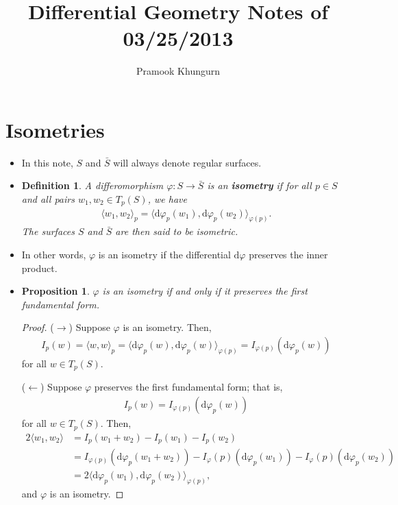 \documentclass[10pt]{article}
\title{Differential Geometry Notes of 03/25/2013}
\author{Pramook Khungurn}
\newtheorem{definition}[lemma]{Definition}
\newtheorem{proposition}[lemma]{Proposition}
\newcommand{\dee}{\mathrm{d}}
\newcommand{\ra}{\rightarrow}
\begin{document}
  \maketitle

  \section{Isometries}
  \begin{itemize}
    \item In this note, $S$ and $\bar S$ will always denote regular surfaces.

    \item \begin{definition}
      A differomorphism $\varphi : S \ra \bar S$ is an {\bf isometry} if for all $p \in S$ and all pairs $w_1, w_2 \in T_p(S)$, we have
      \begin{align*}
        \langle w_1, w_2 \rangle_p = \langle \dee \varphi_p(w_1), \dee \varphi_p(w_2) \rangle_{\varphi(p)}.
      \end{align*}
      The surfaces $S$ and $\bar S$ are then said to be isometric.
    \end{definition}

    \item In other words, $\varphi$ is an isometry if the differential $\dee \varphi$ preserves the inner product.

    \item \begin{proposition}
      $\varphi$ is an isometry if and only if it preserves the first fundamental form.
    \end{proposition}
    \begin{proof}
      ($\ra$) Suppose $\varphi$ is an isometry. Then,
      \begin{align*}
        I_p(w) = \langle w, w \rangle_p = \langle \dee\varphi_p(w), \dee\varphi_p(w) \rangle_{\varphi(p)} = I_{\varphi(p)}(\dee\varphi_p(w))
      \end{align*}
      for all $w \in T_p(S)$.

      ($\leftarrow$) Suppose $\varphi$ preserves the first fundamental form; that is,
      \begin{align*}
        I_p(w) = I_{\varphi(p)}(\dee\varphi_p(w))
      \end{align*}
      for all $w \in T_p(S)$. Then,
      \begin{align*}
        2 \langle w_1, w_2 \rangle 
        &= I_p(w_1 + w_2) - I_p(w_1) - I_p(w_2)\\
        &= I_{\varphi(p)}(\dee\varphi_p(w_1 + w_2)) - I_\varphi(p)(\dee\varphi_p(w_1)) - I_\varphi(p)(\dee\varphi_p(w_2))\\
        &= 2\langle \dee\varphi_p(w_1), \dee\varphi_p(w_2) \rangle_{\varphi(p)},
      \end{align*}
      and $\varphi$ is an isometry.
    \end{proof}    


\end{itemize}
\end{document}
